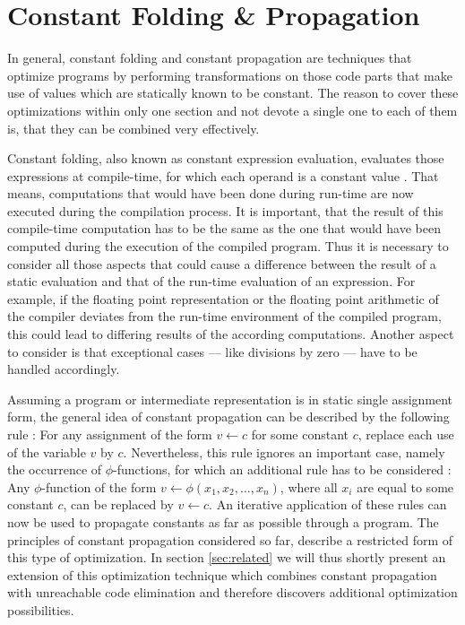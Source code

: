 \section{Constant Folding \& Propagation}
\label{sec:constantprop}

In general, constant folding and constant propagation are techniques that optimize programs by performing transformations on those code parts that make use of values which are statically known to be constant. The reason to cover these optimizations within only one section and not devote a single one to each of them is, that they can be combined very effectively.

Constant folding, also known as constant expression evaluation, evaluates those expressions at compile-time, for which each operand is a constant value \cite{muchnick:1997:advanced-compiler-design}. That means, computations that would have been done during run-time are now executed during the compilation process. It is important, that the result of this compile-time computation has to be the same as the one that would have been computed during the execution of the compiled program. Thus it is necessary to consider all those aspects that could cause a difference between the result of a static evaluation and that of the run-time evaluation of an expression. For example, if the floating point representation or the floating point arithmetic of the compiler deviates from the run-time environment of the compiled program, this could lead to differing results of the according computations. Another aspect to consider is that exceptional cases --- like divisions by zero --- have to be handled accordingly.

Assuming a program or intermediate representation is in static single assignment form, the general idea of constant propagation can be described by the following rule \cite{appel:2004:moderncompilerimpl}: For any assignment of the form $v \leftarrow c$ for some constant $c$, replace each use of the variable $v$ by $c$. Nevertheless, this rule ignores an important case, namely the occurrence of $\phi$-functions, for which an additional rule has to be considered \cite{appel:2004:moderncompilerimpl}: Any $\phi$-function of the form $v \leftarrow \phi (x_1, x_2,\ldots , x_n)$, where all $x_i$ are equal to some constant $c$, can be replaced by $v \leftarrow c$. An iterative application of these rules can now be used to propagate constants as far as possible through a program. The principles of constant propagation considered so far, describe a restricted form of this type of optimization. In section \ref{sec:related} we will thus shortly present an extension of this optimization technique which combines constant propagation with unreachable code elimination and therefore discovers additional optimization possibilities.

